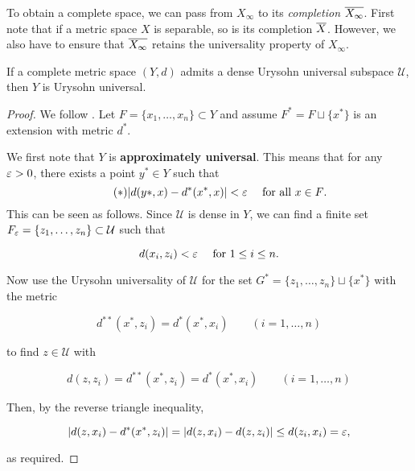 To obtain a complete space, we can pass from $X_\infty$ to its \textit{completion} $\overline{X_\infty}$. First note that if a metric space $X$ is separable, so is its completion $\overline{X}$. However, we also have to ensure that $\overline{X_\infty}$ retains the universality property of $X_\infty$.

\begin{lemma}If a complete metric space $(Y,d)$ admits a dense Urysohn universal subspace $\mathcal{U}$, then $Y$ is Urysohn universal.

\end{lemma}\begin{proof}We follow \cite{Gromov:1999a}. Let $F = \{x_1, \dots, x_n\} \subset Y$ and assume $F^* = F \sqcup \{x^*\}$ is an extension with metric $d^*$.

We first note that $Y$ is \textbf{approximately universal}. This means that for any $\varepsilon > 0$, there exists a point $y^* \in Y$ such that
\begin{equation*}
\tag{$*$}
	|d(y*,x) - d^*(x^*,x)| < \varepsilon \quad \text{ for all $x \in F$}.
\end{equation*}
This can be seen as follows. Since $\mathcal{U}$ is dense in $Y$, we can find a finite set $F_\varepsilon = \{z_1, \dots, z_n\} \subset \mathcal{U}$ such that

\begin{equation}
d(x_i, z_i) < \varepsilon \quad \text{ for $1 \leq i \leq n$}.
\end{equation}

Now use the Urysohn universality of $\mathcal{U}$ for the set $G^* = \{z_1, \dots , z_n\} \sqcup \{x^*\}$ with the metric

\begin{equation}
d^{**}(x^*, z_i) = d^*(x^*, x_i) \qquad (i = 1, \dots, n)
\end{equation}

to find $z \in \mathcal{U}$ with

\begin{equation}
d(z,z_i) = d^{**}(x^*,z_i) = d^*(x^*,x_i) \qquad (i = 1, \dots, n)
\end{equation}

Then, by the reverse triangle inequality,

\begin{equation}
\left | d(z,x_i) - d^*(x^*,z_i) \right | = \left | d(z,x_i) - d(z,z_i) \right | \leq d(z_i, x_i) = \varepsilon,
\end{equation}

as required.


\end{proof}
